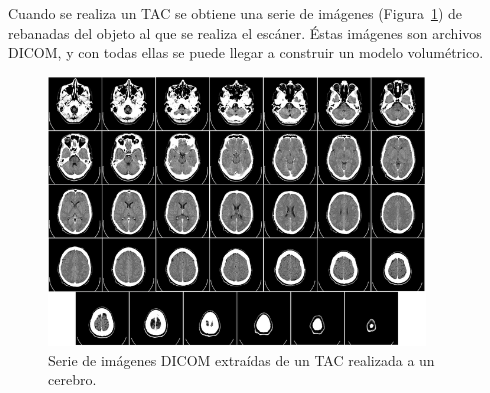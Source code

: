 Cuando se realiza un TAC se obtiene una serie de imágenes (Figura~\ref{fig:brain_dicom_serie}) de rebanadas del objeto al que se realiza el escáner. Éstas imágenes son archivos DICOM, y con todas ellas se puede llegar a construir un modelo volumétrico.

\begin{figure}[H]
	\centering
	\includegraphics[width=10cm]{imagenes/brain_dicom_serie}
	\caption{Serie de imágenes DICOM extraídas de un TAC realizada a un cerebro.}
	\label{fig:brain_dicom_serie}
\end{figure}